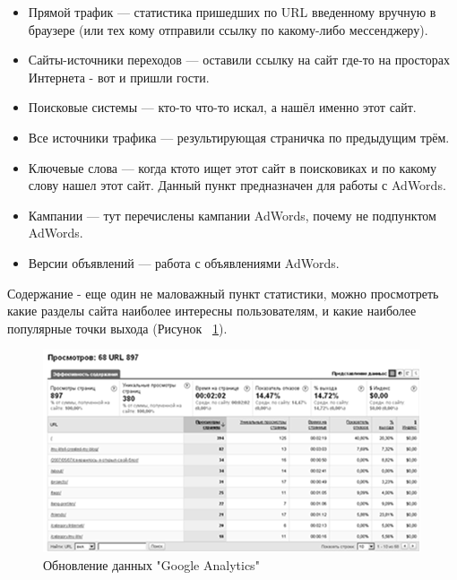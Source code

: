 \documentclass[a4paper,english,russian]{G2-105}
\begin{document}
\begin{itemize}
\item Прямой трафик --- статистика пришедших по URL введенному вручную в браузере (или тех кому отправили ссылку по какому-либо мессенджеру).
\item Сайты-источники переходов --- оставили ссылку на сайт где-то на просторах Интернета - вот и пришли гости.
\item Поисковые системы --- кто-то что-то искал, а нашёл именно этот сайт.
\item Все источники трафика --- результирующая страничка по предыдущим трём.
\item Ключевые слова --- когда ктото ищет этот сайт в поисковиках и по какому слову нашел этот сайт. Данный пункт предназначен для работы с AdWords.
\item Кампании --- тут перечислены кампании AdWords, почему не подпунктом AdWords.
\item Версии объявлений --- работа с объявлениями AdWords.
\end{itemize}
\par Содержание - еще один не маловажный пункт статистики, можно просмотреть какие разделы сайта наиболее интересны пользователям, и какие наиболее популярные точки выхода (Рисунок ~\ref{ris6}).
\begin{figure}
    \includegraphics[width=\linewidth]{ris6.png}
    \caption{Обновление данных "Google Analytics"}
	\label{ris6}
\end{figure}
\end{document}
